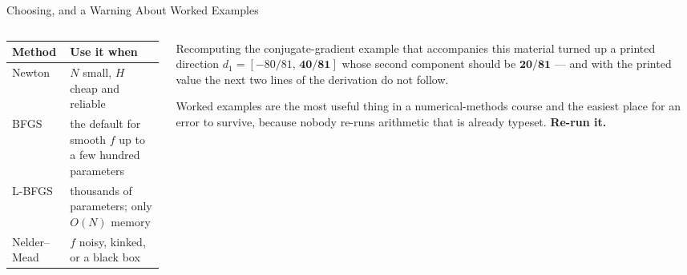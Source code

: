 \begin{frame}{Choosing, and a Warning About Worked Examples}
\begin{columns}[T]
\begin{column}{0.51\textwidth}
\renewcommand{\arraystretch}{1.15}
\begin{center}\footnotesize
\begin{tabularx}{\linewidth}{@{}>{\raggedright\arraybackslash}p{1.9cm} >{\raggedright\arraybackslash}X@{}}
\toprule
\textbf{Method} & \textbf{Use it when} \\
\midrule
Newton & $N$ small, $H$ cheap and reliable \\
BFGS & the default for smooth $f$ up to a few hundred parameters \\
L-BFGS & thousands of parameters; only $O(N)$ memory \\
Nelder--Mead & $f$ noisy, kinked, or a black box \\
\bottomrule
\end{tabularx}
\end{center}
\end{column}
\begin{column}{0.46\textwidth}
\begin{cautionbox}[title=\textbf{Check the arithmetic in your sources}]\footnotesize
Recomputing the conjugate-gradient example that accompanies this material turned up a printed direction
$d_1=[-80/81,\,\mathbf{40/81}]$ whose second component should be $\mathbf{20/81}$ --- and with the printed value the next two lines of the derivation do not follow.
\end{cautionbox}
\medskip
\begin{takeawaybox}\footnotesize
Worked examples are the most useful thing in a numerical-methods course and the easiest place for an error to survive, because nobody re-runs arithmetic that is already typeset. \textbf{Re-run it.}
\end{takeawaybox}
\end{column}
\end{columns}
\end{frame}

